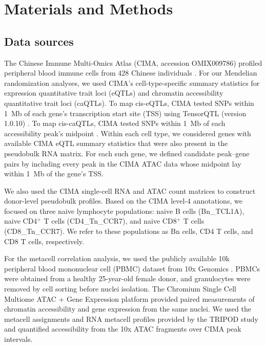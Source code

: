 \section{Materials and Methods}
\label{sec:methods}

\subsection{Data sources}

The Chinese Immune Multi-Omics Atlas (CIMA, accession OMIX009786) profiled peripheral blood immune cells from 428 Chinese individuals \cite{yin2026cima}. For our Mendelian randomization analyses, we used CIMA's cell-type-specific summary statistics for expression quantitative trait loci (eQTLs) and chromatin accessibility quantitative trait loci (caQTLs). To map cis-eQTLs, CIMA tested SNPs within 1~Mb of each gene's transcription start site (TSS) using TensorQTL (version 1.0.10) \cite{taylorweiner2019tensorqtl}. To map cis-caQTLs, CIMA tested SNPs within 1~Mb of each accessibility peak's midpoint \cite{yin2026cima}. Within each cell type, we considered genes with available CIMA eQTL summary statistics that were also present in the pseudobulk RNA matrix. For each such gene, we defined candidate peak--gene pairs by including every peak in the CIMA ATAC data whose midpoint lay within 1~Mb of the gene's TSS.

\noindent We also used the CIMA single-cell RNA and ATAC count matrices to construct donor-level pseudobulk profiles. Based on the CIMA level-4 annotations, we focused on three naive lymphocyte populations: naive B cells (Bn\_TCL1A), naive CD4$^+$ T cells (CD4\_Tn\_CCR7), and naive CD8$^+$ T cells (CD8\_Tn\_CCR7). We refer to these populations as Bn cells, CD4 T cells, and CD8 T cells, respectively.

\noindent For the metacell correlation analysis, we used the publicly available 10k peripheral blood mononuclear cell (PBMC) dataset from 10x Genomics \cite{tenx2020pbmc10k}. PBMCs were obtained from a healthy 25-year-old female donor, and granulocytes were removed by cell sorting before nuclei isolation. The Chromium Single Cell Multiome ATAC + Gene Expression platform provided paired measurements of chromatin accessibility and gene expression from the same nuclei. We used the metacell assignments and RNA metacell profiles provided by the TRIPOD study \cite{jiang2022tripod} and quantified accessibility from the 10x ATAC fragments over CIMA peak intervals.



